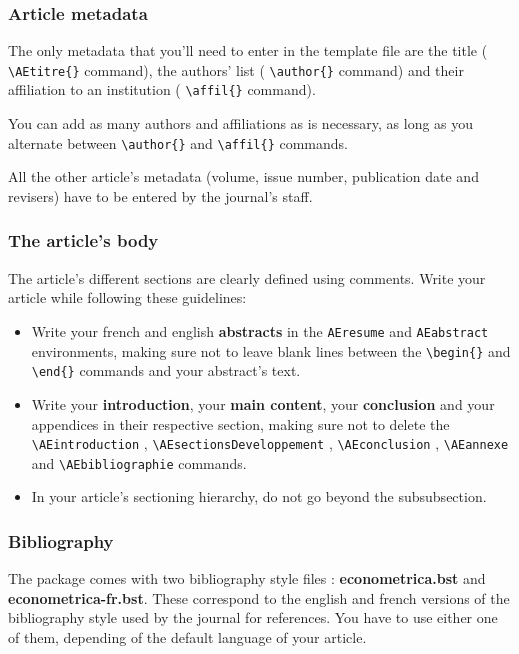 \documentclass[english]{article}
\newcommand{\cmd}[1]{%
	\texttt{\textbackslash#1\{\}}
}
\newcommand{\dec}[1]{%
	\texttt{\textbackslash#1}
}
\begin{document}
			\subsubsection{Article metadata}
			
				The only metadata that you'll need to enter in the template file are the title
				(\cmd{AEtitre} command), the authors' list (\cmd{author} command)
				and their affiliation to an institution (\cmd{affil} command).
				
				You can add as many authors and affiliations as is necessary, as long as you alternate
				between \cmd{author} and \cmd{affil} commands.
				
				All the other article's metadata (volume, issue number, publication date and revisers) have
				to be entered by the journal's staff.
				
			\subsubsection{The article's body}
			
				The article's different sections are clearly defined using comments. Write your article
				while following these guidelines:
				
				\begin{itemize}
					\item Write your french and english \textbf{abstracts} in the \texttt{AEresume} and
						\texttt{AEabstract} environments, making sure not to leave blank lines between
						the \cmd{begin} and \cmd{end} commands and your abstract's text.
					\item Write your \textbf{introduction}, your \textbf{main content}, your \textbf{conclusion} 
						and your appendices in their respective section, 
						making sure not to delete the \dec{AEintroduction},
						\dec{AEsectionsDeveloppement}, \dec{AEconclusion}, \dec{AEannexe} and \dec{AEbibliographie} commands.
					\item In your article's sectioning hierarchy, do not go beyond the subsubsection.
				\end{itemize}
			
			\subsubsection{Bibliography}
			
				The package comes with two bibliography style files : \textbf{econometrica.bst} and 
				\textbf{econometrica-fr.bst}. These correspond to the english and french versions
				of the bibliography style used by the journal for references. You have to use either one
				of them, depending of the default language of your article.
				
\end{document}

